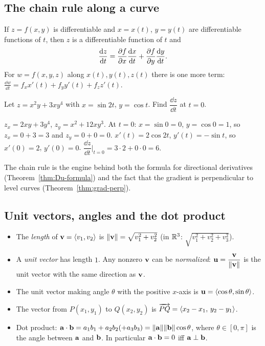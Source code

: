 \subsection{The chain rule along a curve}

\begin{theorem}\label{thm:chain}
If $z=f(x,y)$ is differentiable and $x=x(t)$, $y=y(t)$ are differentiable
functions of $t$, then $z$ is a differentiable function of $t$ and
\[
  \frac{\mathrm{d} z}{\mathrm{d} t}=\frac{\partial f}{\partial x}\frac{\mathrm{d} x}{\mathrm{d} t}+\frac{\partial f}{\partial y}\frac{\mathrm{d} y}{\mathrm{d} t}.
\]
For $w=f(x,y,z)$ along $x(t),y(t),z(t)$ there is one more term:
$\frac{\dd w}{\dd t}=f_x x'(t)+f_y y'(t)+f_z z'(t)$.
\end{theorem}

\begin{example}\label{ex:chain}
Let $z=x^2y+3xy^4$ with $x=\sin2t$, $y=\cos t$. Find $\dfrac{\dd z}{\dd t}$ at $t=0$.
\end{example}
\begin{solution}
 $z_x=2xy+3y^4$, $z_y=x^2+12xy^3$.
 At $t=0$: $x=\sin0=0$, $y=\cos0=1$, so $z_x=0+3=3$ and $z_y=0+0=0$.
 $x'(t)=2\cos2t$, $y'(t)=-\sin t$, so $x'(0)=2$, $y'(0)=0$.
 $\dfrac{\dd z}{\dd t}\Big|_{t=0}=3\cdot2+0\cdot0=6.$
\end{solution}

The chain rule is the engine behind both the formula for directional
derivatives (Theorem~\ref{thm:Du-formula}) and the fact that the gradient is
perpendicular to level curves (Theorem~\ref{thm:grad-perp}).

\subsection{Unit vectors, angles and the dot product}

\begin{itemize}
  \item The \emph{length} of $\mathbf{v}=\left\langle v_1,v_2 \right\rangle$ is $\lVert\mathbf{v}\rVert=\sqrt{v_1^2+v_2^2}$
        (in $\mathbb{R}^3$: $\sqrt{v_1^2+v_2^2+v_3^2}$).
  \item A \emph{unit vector} has length $1$. Any nonzero $\mathbf{v}$ can be
        \emph{normalized}: $\mathbf{u}=\dfrac{\mathbf{v}}{\lVert\mathbf{v}\rVert}$ is the unit vector with the
        same direction as $\mathbf{v}$.
  \item The unit vector making angle $\theta$ with the positive $x$-axis is
        $\mathbf{u}=\left\langle \cos\theta,\sin\theta \right\rangle$.
  \item The vector from $P(x_1,y_1)$ to $Q(x_2,y_2)$ is
        $\overrightarrow{PQ}=\left\langle x_2-x_1,\,y_2-y_1 \right\rangle$.
  \item Dot product: $\mathbf{a}\cdot\mathbf{b}=a_1b_1+a_2b_2(+a_3b_3)
        =\lVert\mathbf{a}\rVert\lVert\mathbf{b}\rVert\cos\theta$, where $\theta\in[0,\pi]$ is the angle
        between $\mathbf{a}$ and $\mathbf{b}$. In particular $\mathbf{a}\cdot\mathbf{b}=0$ iff
        $\mathbf{a}\perp\mathbf{b}$.
\end{itemize}

